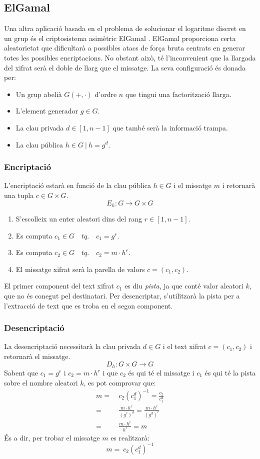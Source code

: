 \documentclass{article}
\begin{document}
\subsection{ElGamal}
Una altra aplicació basada en el problema de solucionar el logaritme discret en un grup és el criptosistema asimètric ElGamal \cite{elgamal}. ElGamal proporciona certa aleatorietat que dificultarà a possibles atacs de força bruta centrats en generar totes les possibles encriptacions. No obstant això, té l'inconvenient que la llargada del xifrat serà el doble de llarg que el missatge. La seva configuració és donada per:
\begin{itemize}
	\item Un grup abelià $G(+, \cdot)$ d'ordre $n$ que tingui una factorització llarga. 
	\item L'element generador $g \in G$.
	\item La clau privada $d \in [1, n-1]$ que també serà la informació trampa.
	\item La clau pública $h \in G \ | \ h = g^d$.
\end{itemize}
\subsubsection{Encriptació}
L'encriptació estarà en funció de la clau pública $h \in G$ i el missatge $m$ i retornarà una tupla $c \in G \times G$.
\[ E_h : G \rightarrow G \times G \]
\begin{enumerate}
	\item S'escolleix un enter aleatori dins del rang $r \in [1, n-1]$.
	\item Es computa $c_1 \in G \quad tq. \quad c_1 = g^r$.
	\item Es computa $c_2 \in G \quad tq. \quad c_2 = m \cdot h^r$.
	\item El missatge xifrat serà la parella de valors $c = (c_1, c_2)$.
\end{enumerate}
El primer component del text xifrat $c_1$ es diu \textit{pista}, ja que conté valor aleatori $k$, que no és conegut pel destinatari. Per desencriptar, s'utilitzarà la pista per a l'extracció de text que es troba en el segon component.
\subsubsection{Desencriptació}
La desencriptació necessitarà la clau privada $d \in G$ i el text xifrat $c = (c_1, c_2)$ i retornarà el missatge.
\[D_h : G \times G \rightarrow G \] 
Sabent que $c_1 = g^r$ i $c_2 = m \cdot h^r$ i que $c_2$ és qui té el missatge i $c_1$ és qui té la pista sobre el nombre aleatori $k$, es pot comprovar que:
\begin{equation*}
	\begin{aligned}
		m =& \ c_2 (c_1^d)^{-1}	= \frac{c_2}{c_1^d}	\\
		=& \ \frac{m \cdot h^r}{(g^r)^d} = \frac{m \cdot h^r}{(g^d)^r}\\
		=& \ \frac{m \cdot h^r}{h^r} = m
	\end{aligned}
\end{equation*}
És a dir, per trobar el missatge $m$ es realitzarà:
\[ m = \ c_2 (c_1^d)^{-1} \]
\end{document}

